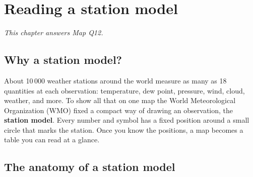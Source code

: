 \chapter{Reading a station model}\label{p3-ch:station}

\textit{This chapter answers Map Q12.}

\section{Why a station model?}

About 10\,000 weather stations around the world measure as many as 18 quantities at each observation: temperature, dew point, pressure, wind, cloud, weather, and more. To show all that on one map the World Meteorological Organization (WMO) fixed a compact way of drawing an observation, the \textbf{station model}. Every number and symbol has a fixed position around a small circle that marks the station. Once you know the positions, a map becomes a table you can read at a glance.

\section{The anatomy of a station model}

\newcommand{\modelpic}[2]{\begin{tikzpicture}[x=0.052cm,y=-0.052cm,line cap=round]#2\end{tikzpicture}}
\newcommand{\leader}[4]{\draw[gray,thin] (#1,#2) -- (#3,#4);}

